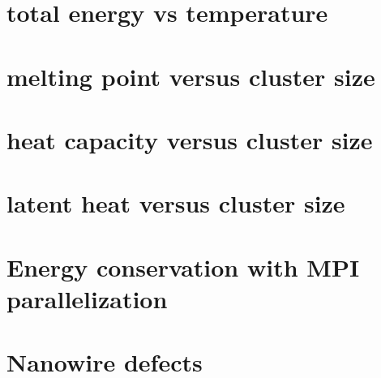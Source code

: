 \section{total energy vs temperature}
\section{melting point versus cluster size}
\section{heat capacity versus cluster size}
\section{latent heat versus cluster size}
\section{Energy conservation with MPI parallelization}
\section{Nanowire defects}